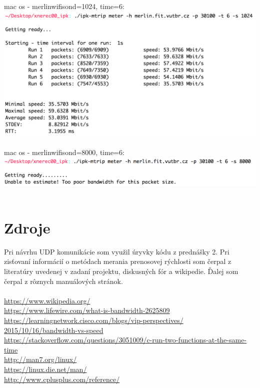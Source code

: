 \documentclass[a4paper, 11pt]{article}
\begin{document}
mac os - merlin\qquad wifi\qquad sond=1024, time=6:\\
\includegraphics[scale=0.2]{pic/mac2.png}\\\\
mac os - merlin\qquad wifi\qquad sond=8000, time=6:\\
\includegraphics[scale=0.2]{pic/mac3.png}\\\\


\newpage
\section{Zdroje}
Pri návrhu UDP komunikácie som využil úryvky kódu z prednášky 2. 
Pri zisťovaní informácií o metódach merania prenosovej rýchlosti som čerpal z literatúry uvedenej v zadaní projektu, diskusných fór a wikipedie.
Ďalej som čerpal z rôznych manuálových stránok.\\\\
\url{https://www.wikipedia.org/}\\
\url{https://www.lifewire.com/what-is-bandwidth-2625809}\\
\url{https://learningnetwork.cisco.com/blogs/vip-perspectives/
	2015/10/16/bandwidth-vs-speed}\\
\url{https://stackoverflow.com/questions/3051009/c-run-two-functions-at-the-same-time}\\
\url{http://man7.org/linux/}\\
\url{https://linux.die.net/man/}\\
\url{http://www.cplusplus.com/reference/}\\
\end{document}

